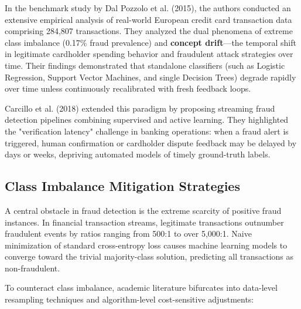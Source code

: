 \documentclass[12pt,a4paper,oneside]{report}
\begin{document}
In the benchmark study by Dal Pozzolo et al. (2015), the authors conducted an extensive empirical analysis of real-world European credit card transaction data comprising 284,807 transactions. They analyzed the dual phenomena of extreme class imbalance (0.17\% fraud prevalence) and \textbf{concept drift}---the temporal shift in legitimate cardholder spending behavior and fraudulent attack strategies over time. Their findings demonstrated that standalone classifiers (such as Logistic Regression, Support Vector Machines, and single Decision Trees) degrade rapidly over time unless continuously recalibrated with fresh feedback loops.


Carcillo et al. (2018) extended this paradigm by proposing streaming fraud detection pipelines combining supervised and active learning. They highlighted the "verification latency" challenge in banking operations: when a fraud alert is triggered, human confirmation or cardholder dispute feedback may be delayed by days or weeks, depriving automated models of timely ground-truth labels.


\subsection{Class Imbalance Mitigation Strategies}

A central obstacle in fraud detection is the extreme scarcity of positive fraud instances. In financial transaction streams, legitimate transactions outnumber fraudulent events by ratios ranging from 500:1 to over 5,000:1. Naive minimization of standard cross-entropy loss causes machine learning models to converge toward the trivial majority-class solution, predicting all transactions as non-fraudulent.


To counteract class imbalance, academic literature bifurcates into data-level resampling techniques and algorithm-level cost-sensitive adjustments:
\end{document}
